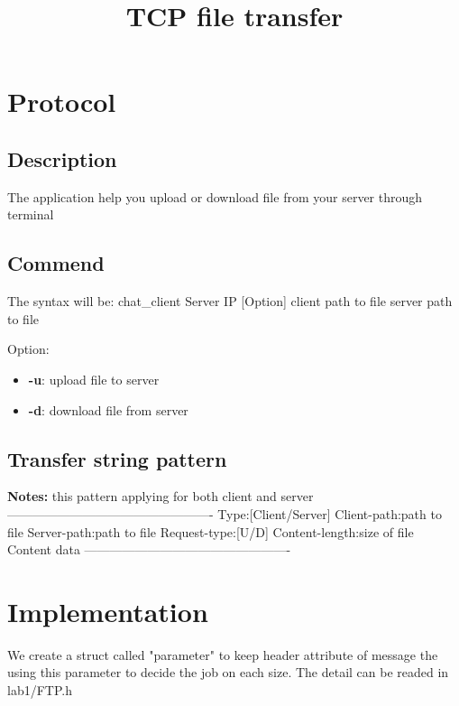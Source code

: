 \documentclass{article}
\title{TCP file transfer}
\begin{document}
\maketitle
\section{Protocol}
\subsection{Description}
The application help you upload or download file from your server through terminal
\subsection{Commend}
The syntax will be:
chat_client {Server IP} [Option] {client path to file} {server path to file}

Option:
\begin{itemize}
\item \textbf{-u}: upload file to server
\item \textbf{-d}: download file from server
\end{itemize}

\subsection{Transfer string pattern}
\textbf{Notes:} this pattern applying for both client and server\newline
-------------------------------------------------
Type:[Client/Server]
\n
Client-path:{path to file}
\n
Server-path:{path to file}
\n
Request-type:[U/D]
\n
Content-length:{size of file}
\n\n
{Content data}
-------------------------------------------------
\section{Implementation}
We create a struct called "parameter" to keep header attribute of message the using
this parameter to decide the job on each size. The detail can be readed in lab1/FTP.h
\end{document}
